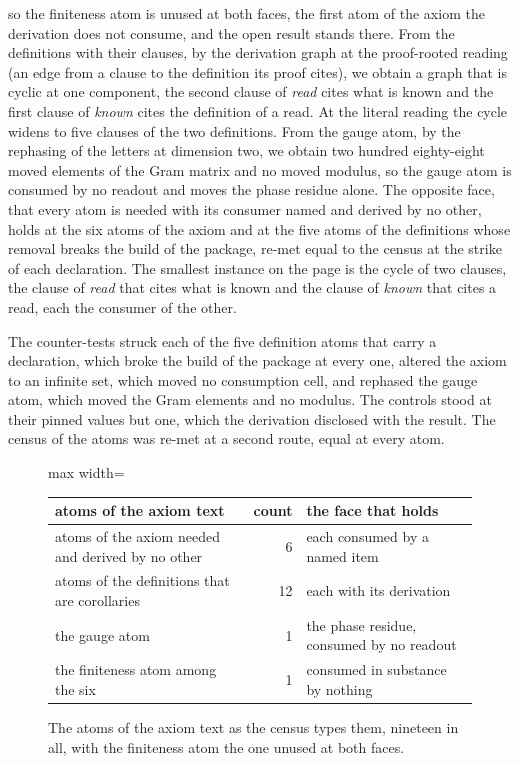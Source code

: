 \begin{chproof}[exact]
so the finiteness atom is unused at both faces, the first atom of the axiom the derivation does not consume, and the open result stands there. From the definitions with their clauses, by the derivation graph at the proof-rooted reading (an edge from a clause to the definition its proof cites), we obtain a graph that is cyclic at one component, the second clause of \emph{read} cites what is known and the first clause of \emph{known} cites the definition of a read. At the literal reading the cycle widens to five clauses of the two definitions. From the gauge atom, by the rephasing of the letters at dimension two, we obtain two hundred eighty-eight moved elements of the Gram matrix and no moved modulus, so the gauge atom is consumed by no readout and moves the phase residue alone. The opposite face, that every atom is needed with its consumer named and derived by no other, holds at the six atoms of the axiom and at the five atoms of the definitions whose removal breaks the build of the package, re-met equal to the census at the strike of each declaration. The smallest instance on the page is the cycle of two clauses, the clause of \emph{read} that cites what is known and the clause of \emph{known} that cites a read, each the consumer of the other.

The counter-tests struck each of the five definition atoms that carry a declaration, which broke the build of the package at every one, altered the axiom to an infinite set, which moved no consumption cell, and rephased the gauge atom, which moved the Gram elements and no modulus. The controls stood at their pinned values but one, which the derivation disclosed with the result. The census of the atoms was re-met at a second route, equal at every atom.
\end{chproof}
\begin{figure}[h]\centering
\begin{adjustbox}{max width=\linewidth}\begin{tabular}{lrl}\toprule
atoms of the axiom text & count & the face that holds \\ \midrule
atoms of the axiom needed and derived by no other & 6 & each consumed by a named item \\
atoms of the definitions that are corollaries & 12 & each with its derivation \\
the gauge atom & 1 & the phase residue, consumed by no readout \\
the finiteness atom among the six & 1 & consumed in substance by nothing \\ \bottomrule
\end{tabular}\end{adjustbox}
\caption{The atoms of the axiom text as the census types them, nineteen in all, with the finiteness atom the one unused at both faces.}
\end{figure}
